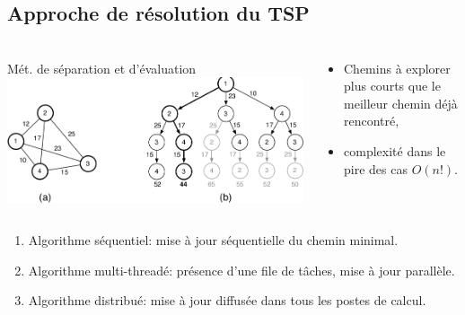 \documentclass[10pt]{beamer}
\begin{document}
\subsection{Approche de résolution du TSP}
\begin{frame}
\frametitle{}
\begin{columns}[T]
    \begin{column}{.49\textwidth}
    \begin{block}{Mét. de séparation et d'évaluation}
	\includegraphics[scale=0.22]{images/approche_tsp.png}
    \end{block} 
    \end{column}
    \begin{column}{.4\textwidth}
     \begin{block}{}
      \begin{itemize}
        \item Chemins à explorer plus courts que le meilleur chemin déjà rencontré,
        \item complexité dans le pire des cas $O(n!)$.
      \end{itemize}
     \end{block}
    \end{column}
  \end{columns}
\begin{block}{}
   \begin{enumerate}
	   \item Algorithme séquentiel: mise à jour séquentielle du chemin minimal.
	   \item Algorithme multi-threadé: présence d'une file de tâches, mise à jour parallèle.
	   \item Algorithme distribué: mise à jour diffusée dans tous les postes de calcul.
  \end{enumerate}
\end{block}
\end{frame}
\end{document}
